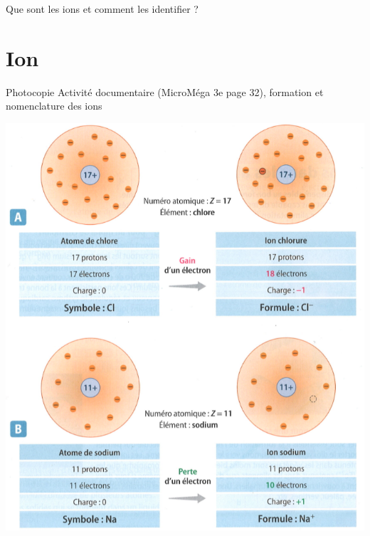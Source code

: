 \documentclass[12pt,a4paper]{article}
\date{}
\title{}
\begin{document}
	
	


\begin{mypb}
	\begin{center}
		{\Large Que sont les ions et comment les identifier  ?}
	\end{center}
\end{mypb}



\section{Ion}
\begin{myact}{Photocopie}
Activité documentaire (MicroMéga 3e page 32), formation et nomenclature des ions
\end{myact}






\begin{center}
	\includegraphics[scale=0.7]{bilan_ions}
\end{center}
\end{document}
